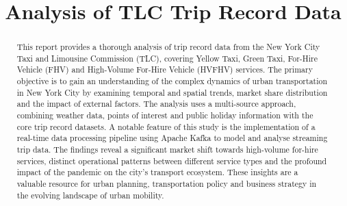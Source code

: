 \documentclass[conference]{IEEEtran}
\begin{document}
\title{Analysis of TLC Trip Record Data}

\author{
  \and
  }

\maketitle

\begin{abstract}
  This report provides a thorough analysis of trip record data from the New York City Taxi and Limousine Commission (TLC),
  covering Yellow Taxi, Green Taxi, For-Hire Vehicle (FHV) and High-Volume For-Hire Vehicle (HVFHV) services. The primary
  objective is to gain an understanding of the complex dynamics of urban transportation in New York City by examining
  temporal and spatial trends, market share distribution and the impact of external factors. The analysis uses a
  multi-source approach, combining weather data, points of interest and public holiday information with the core trip
  record datasets. A notable feature of this study is the implementation of a real-time data processing pipeline using
  Apache Kafka to model and analyse streaming trip data. The findings reveal a significant market shift towards
  high-volume for-hire services, distinct operational patterns between different service types and the profound impact of
  the pandemic on the city's transport ecosystem. These insights are a valuable resource for urban planning,
  transportation policy and business strategy in the evolving landscape of urban mobility.
\end{abstract}


\end{document}
